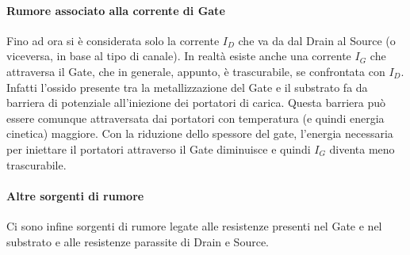 \paragraph*{Rumore associato alla corrente di Gate}
Fino ad ora si è considerata solo la corrente $I_D$ che va da dal Drain al Source (o viceversa, in base al tipo di canale). In realtà esiste anche una corrente $I_G$ che attraversa il Gate, che in generale, appunto, è trascurabile, se confrontata con  $I_D$. Infatti l'ossido presente tra la metallizzazione del Gate e il substrato fa da barriera di potenziale all'iniezione dei portatori di carica. Questa barriera può essere comunque attraversata dai portatori con temperatura (e quindi energia cinetica) maggiore. Con la riduzione dello spessore del gate, l'energia necessaria per iniettare il portatori attraverso il Gate diminuisce e quindi $I_G$ diventa meno trascurabile.

\paragraph*{Altre sorgenti di rumore}
Ci sono infine sorgenti di rumore legate alle resistenze presenti nel Gate e nel substrato e alle resistenze parassite di Drain e Source. 